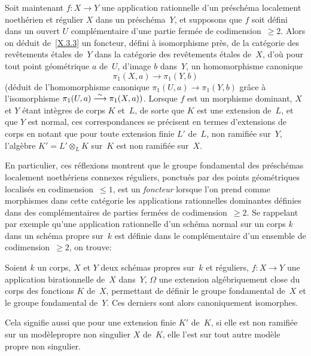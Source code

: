\medskip
Soit maintenant $f\colon X\to Y$ une application rationnelle d'un
pr\'esch\'ema localement noeth\'erien et r\'egulier $X$
dans un pr\'esch\'ema~$Y$, et supposons que $f$ soit d\'efini
dans un ouvert $U$ compl\'ementaire d'une partie ferm\'ee de
codimension~$\ge 2$. Alors on d\'eduit de~\ref{X.3.3} un foncteur,
d\'efini \`a isomorphisme pr\`es, de la cat\'egorie des
rev\^etements \'etales de~$Y$ dans la cat\'egorie des
rev\^etements \'etales de~$X$, d'o\`u pour tout point
g\'eom\'etrique $a$ de~$U$, d'image $b$ dans~$Y$, un homomorphisme
canonique
$$
\pi_1(X,a)\to \pi_1(Y,b)
$$
(d\'eduit
de l'homomorphisme canonique $\pi_1(U,a)\to \pi_1(Y,b)$ gr\^ace
\`a l'isomorphisme $\pi_1(U,a)\overset{\sim}{\longrightarrow} \pi_1(X,a))$. Lorsque $f$ est
un morphisme dominant, $X$ et $Y$ \'etant int\`egres de corps $K$
et~$L$, de sorte que $K$ est une extension de~$L$, et que $Y$ est
normal, ces correspondances se pr\'ecisent en termes d'extensions de
corps en notant que pour toute extension finie $L'$ de~$L$, non
ramifi\'ee sur~$Y$, l'alg\`ebre $K'=L'\otimes_L K$ sur~$K$ est non
ramifi\'ee sur~$X$.

En particulier, ces r\'eflexions montrent que le groupe fondamental
des pr\'esch\'emas localement noeth\'eriens connexes
r\'eguliers, ponctu\'es par des points g\'eom\'etriques
localis\'es en codimension~$\le 1$, est un \emph{foncteur} lorsque
l'on prend comme morphismes dans cette cat\'egorie les applications
rationnelles dominantes d\'efinies dans des compl\'ementaires de
parties ferm\'ees de codimension~$\ge 2$. Se rappelant par exemple
qu'une application rationnelle d'un sch\'ema normal sur un corps $k$
dans un sch\'ema propre sur~$k$ est d\'efinie dans le
compl\'ementaire d'un ensemble de codimension~$\ge 2$, on trouve:

\begin{corollaire}
\label{X.3.4}
Soient $k$ un corps, $X$ et $Y$ deux sch\'emas propres sur~$k$ et
r\'eguliers, $f\colon X\to Y$ une application birationnelle de~$X$
dans~$Y$, $\Omega$ une extension alg\'ebriquement close du corps des
fonctions $K$ de~$X$, permettant de d\'efinir le groupe fondamental
de~$X$ et le groupe fondamental de~$Y$. Ces derniers sont alors
canoniquement isomorphes.
\end{corollaire}

Cela signifie aussi que pour une extension finie $K'$ de~$K$, si elle
est non ramifi\'ee sur un \og mod\`ele\fg propre non singulier $X$
de~$K$, elle l'est sur tout autre mod\`ele propre non singulier.

